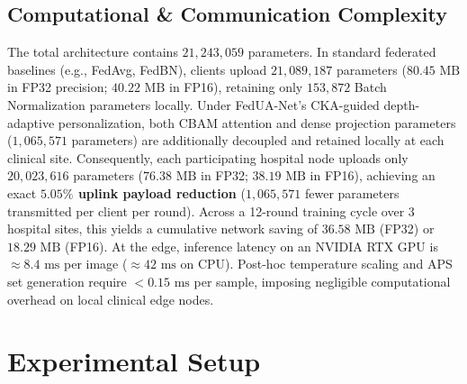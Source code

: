 \documentclass[journal]{IEEEtran}
\begin{document}
\subsection{Computational \& Communication Complexity}
The total architecture contains $21{,}243{,}059$ parameters. In standard federated baselines (e.g., FedAvg, FedBN), clients upload $21{,}089{,}187$ parameters ($80.45\text{ MB}$ in FP32 precision; $40.22\text{ MB}$ in FP16), retaining only $153{,}872$ Batch Normalization parameters locally. Under FedUA-Net's CKA-guided depth-adaptive personalization, both CBAM attention and dense projection parameters ($1{,}065{,}571$ parameters) are additionally decoupled and retained locally at each clinical site. Consequently, each participating hospital node uploads only $20{,}023{,}616$ parameters ($76.38\text{ MB}$ in FP32; $38.19\text{ MB}$ in FP16), achieving an exact \textbf{$5.05\%$ uplink payload reduction} ($1{,}065{,}571$ fewer parameters transmitted per client per round). Across a 12-round training cycle over 3 hospital sites, this yields a cumulative network saving of $36.58\text{ MB}$ (FP32) or $18.29\text{ MB}$ (FP16). At the edge, inference latency on an NVIDIA RTX GPU is $\approx 8.4\text{ ms}$ per image ($\approx 42\text{ ms}$ on CPU). Post-hoc temperature scaling and APS set generation require $<0.15\text{ ms}$ per sample, imposing negligible computational overhead on local clinical edge nodes.

\section{Experimental Setup}
\end{document}
